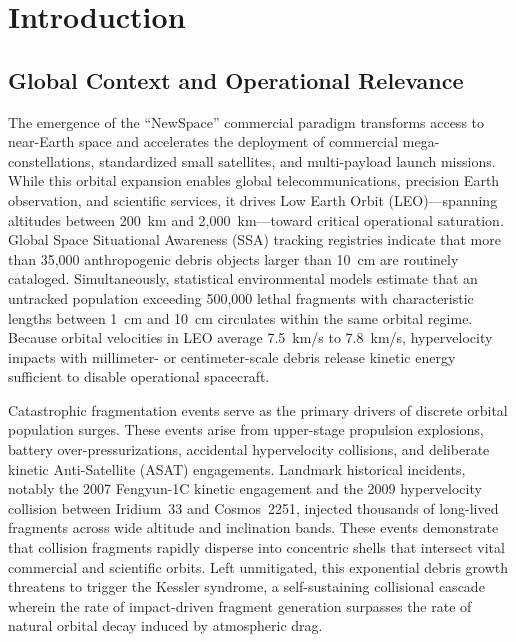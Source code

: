 \chapter{Introduction}
\label{ch:introduction}

\section{Global Context and Operational Relevance}
\label{sec:context}

The emergence of the ``NewSpace'' commercial paradigm transforms access to near-Earth space and accelerates the deployment of commercial mega-constellations, standardized small satellites, and multi-payload launch missions. While this orbital expansion enables global telecommunications, precision Earth observation, and scientific services, it drives Low Earth Orbit (LEO)---spanning altitudes between 200~km and 2,000~km---toward critical operational saturation. Global Space Situational Awareness (SSA) tracking registries indicate that more than 35,000 anthropogenic debris objects larger than 10~cm are routinely cataloged. Simultaneously, statistical environmental models estimate that an untracked population exceeding 500,000 lethal fragments with characteristic lengths between 1~cm and 10~cm circulates within the same orbital regime. Because orbital velocities in LEO average 7.5~km/s to 7.8~km/s, hypervelocity impacts with millimeter- or centimeter-scale debris release kinetic energy sufficient to disable operational spacecraft.

Catastrophic fragmentation events serve as the primary drivers of discrete orbital population surges. These events arise from upper-stage propulsion explosions, battery over-pressurizations, accidental hypervelocity collisions, and deliberate kinetic Anti-Satellite (ASAT) engagements. Landmark historical incidents, notably the 2007 Fengyun-1C kinetic engagement and the 2009 hypervelocity collision between Iridium~33 and Cosmos~2251, injected thousands of long-lived fragments across wide altitude and inclination bands. These events demonstrate that collision fragments rapidly disperse into concentric shells that intersect vital commercial and scientific orbits. Left unmitigated, this exponential debris growth threatens to trigger the Kessler syndrome, a self-sustaining collisional cascade wherein the rate of impact-driven fragment generation surpasses the rate of natural orbital decay induced by atmospheric drag.

